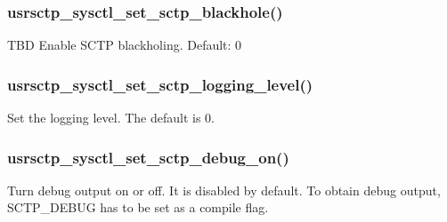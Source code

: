 \documentclass[a4paper]{article}
\begin{document}
\subsubsection{usrsctp\_sysctl\_set\_sctp\_blackhole()}
TBD
Enable SCTP blackholing. Default: 0

\subsubsection{usrsctp\_sysctl\_set\_sctp\_logging\_level()}
Set the logging level. The default is 0.


\subsubsection{usrsctp\_sysctl\_set\_sctp\_debug\_on()}
Turn debug output on or off. It is disabled by default. To obtain debug output,
SCTP\_DEBUG has to be set as a compile flag.
\end{document}
